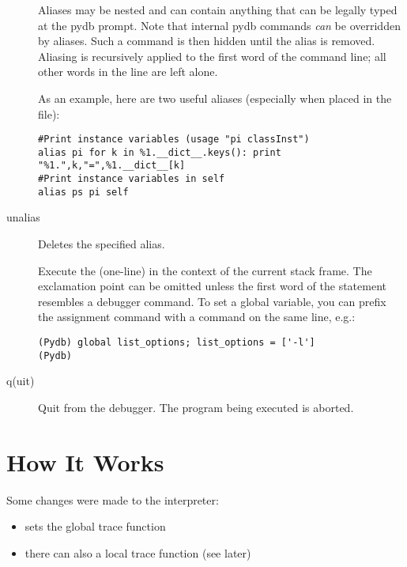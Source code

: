\begin{description}
Aliases may be nested and can contain anything that can be
legally typed at the pydb prompt.  Note that internal pydb commands
\emph{can} be overridden by aliases.  Such a command is
then hidden until the alias is removed.  Aliasing is recursively
applied to the first word of the command line; all other words
in the line are left alone.

As an example, here are two useful aliases (especially when placed
in the  file):

\begin{verbatim}
#Print instance variables (usage "pi classInst")
alias pi for k in %1.__dict__.keys(): print "%1.",k,"=",%1.__dict__[k]
#Print instance variables in self
alias ps pi self
\end{verbatim}
                
\item[unalias \var{name}]

Deletes the specified alias.

\item[\optional{!}\var{statement}]

Execute the (one-line)  in the context of
the current stack frame.
The exclamation point can be omitted unless the first word
of the statement resembles a debugger command.
To set a global variable, you can prefix the assignment
command with a  command on the same line, e.g.:

\begin{verbatim}
(Pydb) global list_options; list_options = ['-l']
(Pydb)
\end{verbatim}

\item[q(uit)]

Quit from the debugger.
The program being executed is aborted.

\end{description}

\section{How It Works \label{debugger-hooks}}

Some changes were made to the interpreter:

\begin{itemize}
\item {} sets the global trace function
\item there can also a local trace function (see later)
\end{itemize}

